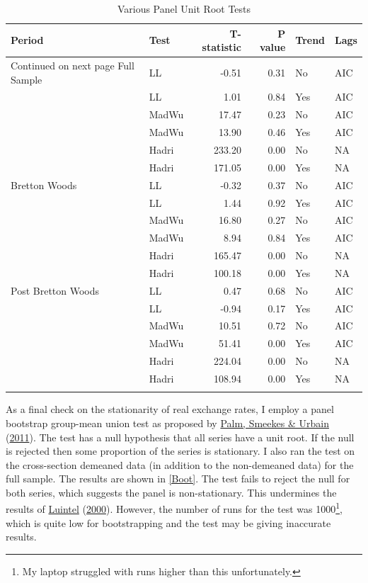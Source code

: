 \documentclass[11pt,preprint, authoryear]{elsarticle}
\numberwithin{equation}{section}
\numberwithin{figure}{section}
\numberwithin{table}{section}
\let\rmarkdownfootnote\footnote%
\def\footnote{\protect\rmarkdownfootnote}
\begin{document}
\begingroup\fontsize{12pt}{13pt}\selectfont
\begin{longtable}{llrrll}
\caption{Various Panel Unit Root Tests} \\ 
  \toprule
Period & Test & T-statistic & P value & Trend & Lags \\ 
  \hline 
\endhead 
\hline 
{\footnotesize Continued on next page} 
\endfoot 
\endlastfoot 
 \midrule
Full Sample & LL & -0.51 & 0.31 & No & AIC \\ 
   & LL & 1.01 & 0.84 & Yes & AIC \\ 
   & MadWu & 17.47 & 0.23 & No & AIC \\ 
   & MadWu & 13.90 & 0.46 & Yes & AIC \\ 
   & Hadri & 233.20 & 0.00 & No & NA \\ 
   & Hadri & 171.05 & 0.00 & Yes & NA \\ 
  Bretton Woods & LL & -0.32 & 0.37 & No & AIC \\ 
   & LL & 1.44 & 0.92 & Yes & AIC \\ 
   & MadWu & 16.80 & 0.27 & No & AIC \\ 
   & MadWu & 8.94 & 0.84 & Yes & AIC \\ 
   & Hadri & 165.47 & 0.00 & No & NA \\ 
   & Hadri & 100.18 & 0.00 & Yes & NA \\ 
  Post Bretton Woods & LL & 0.47 & 0.68 & No & AIC \\ 
   & LL & -0.94 & 0.17 & Yes & AIC \\ 
   & MadWu & 10.51 & 0.72 & No & AIC \\ 
   & MadWu & 51.41 & 0.00 & Yes & AIC \\ 
   & Hadri & 224.04 & 0.00 & No & NA \\ 
   & Hadri & 108.94 & 0.00 & Yes & NA \\ 
   \bottomrule
\label{uunit}
\end{longtable}
\endgroup

As a final check on the stationarity of real exchange rates, I employ a
panel bootstrap group-mean union test as proposed by
\protect\hyperlink{ref-pal}{Palm, Smeekes \& Urbain}
(\protect\hyperlink{ref-pal}{2011}). The test has a null hypothesis that
all series have a unit root. If the null is rejected then some
proportion of the series is stationary. I also ran the test on the
cross-section demeaned data (in addition to the non-demeaned data) for
the full sample. The results are shown in \ref{Boot}. The test fails to
reject the null for both series, which suggests the panel is
non-stationary. This undermines the results of
\protect\hyperlink{ref-Kul}{Luintel}
(\protect\hyperlink{ref-Kul}{2000}). However, the number of runs for the
test was 1000\footnote{My laptop struggled with runs higher than this
  unfortunately.}, which is quite low for bootstrapping and the test may
be giving inaccurate results.
\end{document}

